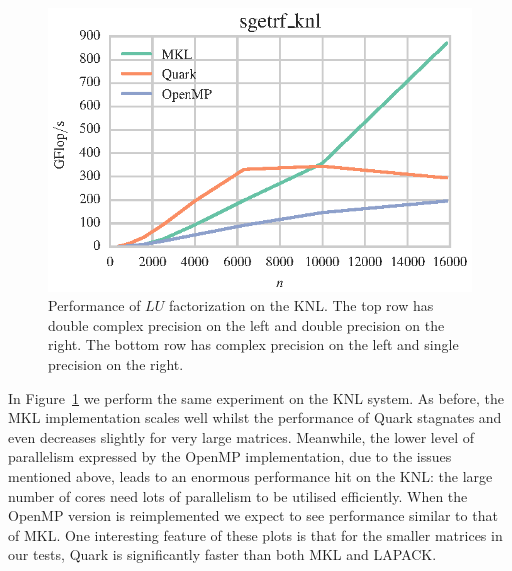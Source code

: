 \documentclass[a4paper,12pt]{article}
\begin{document}
\begin{figure}[t]
  \includegraphics[scale=.85]{fig/knl_ram_sgetrf_weak_scaling.eps}
  \caption{Performance of $LU$ factorization on the KNL.
    The top row has double complex precision on the left and double
    precision on the right.
    The bottom row has complex precision on the left and single
    precision on the right.}
  \label{fig.lu_knl_ram}
\end{figure}

In Figure~\ref{fig.lu_knl_ram} we perform the same experiment
on the KNL system.
As before,
the MKL implementation scales well whilst
the performance of Quark stagnates and even decreases
slightly for very large matrices.
Meanwhile,
the lower level of parallelism expressed by the OpenMP implementation,
due to the issues mentioned above,
leads to an enormous performance hit on the KNL:
the large number of cores need lots of parallelism
to be utilised efficiently.
When the OpenMP version is reimplemented we expect to see
performance similar to that of MKL.
One interesting feature of these plots is that for
the smaller matrices in our tests,
Quark is significantly faster than both MKL and LAPACK.

\end{document}
